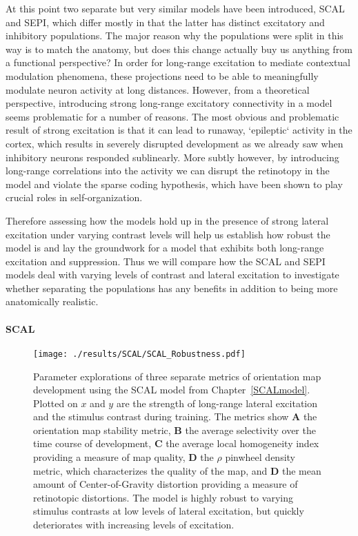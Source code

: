 At this point two separate but very similar models have been
introduced, SCAL and SEPI, which differ mostly in that the latter has
distinct excitatory and inhibitory populations. The major reason why
the populations were split in this way is to match the anatomy, but
does this change actually buy us anything from a functional
perspective? In order for long-range excitation to mediate contextual
modulation phenomena, these projections need to be able to
meaningfully modulate neuron activity at long distances. However, from
a theoretical perspective, introducing strong long-range excitatory
connectivity in a model seems problematic for a number of reasons. The
most obvious and problematic result of strong excitation is that it
can lead to runaway, `epileptic` activity in the cortex, which results
in severely disrupted development as we already saw when inhibitory
neurons responded sublinearly. More subtly however, by introducing
long-range correlations into the activity we can disrupt the
retinotopy in the model and violate the sparse coding hypothesis,
which have been shown to play crucial roles in self-organization.

Therefore assessing how the models hold up in the presence of strong
lateral excitation under varying contrast levels will help us
establish how robust the model is and lay the groundwork for a model
that exhibits both long-range excitation and suppression. Thus we will
compare how the SCAL and SEPI models deal with varying levels of
contrast and lateral excitation to investigate whether separating the
populations has any benefits in addition to being more anatomically
realistic.

\paragraph{SCAL}

\begin{figure}
	\centering
        \texttt{[image: ./results/SCAL/SCAL\_Robustness.pdf]}
	\caption{Parameter explorations of three separate metrics of
      orientation map development using the SCAL model from
      Chapter~\ref{SCALmodel}. Plotted on $x$ and $y$ are the strength
      of long-range lateral excitation and the stimulus contrast
      during training. The metrics show \textbf{A} the orientation map
      stability metric, \textbf{B} the average selectivity over the
      time course of development, \textbf{C} the average local
      homogeneity index providing a measure of map quality, \textbf{D}
      the $\rho$ pinwheel density metric, which characterizes the
      quality of the map, and \textbf{D} the mean amount of
      Center-of-Gravity distortion providing a measure of retinotopic
      distortions. The model is highly robust to varying stimulus
      contrasts at low levels of lateral excitation, but quickly
      deteriorates with increasing levels of excitation.}
	\label{SCALStability}
\end{figure}

